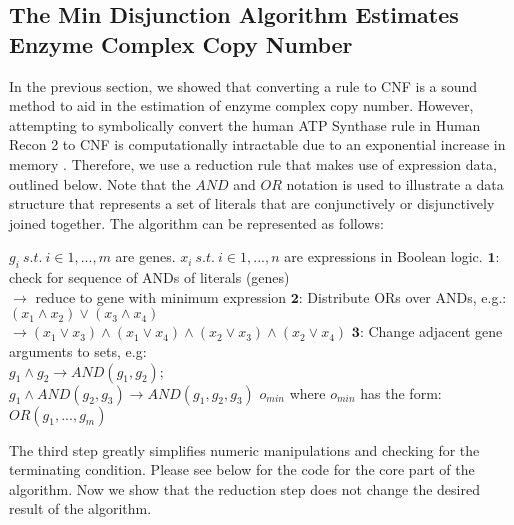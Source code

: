 \begin{methods}
\subsection{The Min Disjunction Algorithm Estimates \\Enzyme Complex Copy Number}

In the previous section, we showed that converting a rule to CNF is a
sound method to aid in the estimation of enzyme complex copy number.
However, attempting to symbolically convert the human ATP Synthase rule in
Human Recon 2 to CNF is computationally intractable due to an
exponential increase in memory \cite{Thiele2013}. Therefore, we use a
reduction rule that makes use of expression data, outlined below.
Note that the $AND$ and $OR$ notation is used to illustrate a
data structure that represents a set of literals that are
conjunctively or disjunctively joined together. The algorithm can be
represented as follows: \\

\pagebreak
\begin{Algorithm}
\label{alg:ReductionToCNF}
\begin{algorithmic}
\REQUIRE $g_i~s.t.~i \in{1, ..., m}$ are genes. 
\REQUIRE $x_i~s.t.~i \in{1, ..., n}$ are expressions in Boolean logic.
  \STATE $\mathbf{1}$: check for sequence of ANDs of literals (genes)\\ 
    \hspace{4.8 mm} $\rightarrow$ reduce to gene with minimum expression 
  \STATE $\mathbf{2}$: Distribute ORs over ANDs, e.g.: $(x_1 \land x_2) \lor (x_3 \land x_4)$ \\ 
    \hspace{4.8 mm} $\rightarrow (x_1 \lor x_3) \land (x_1 \lor x_4) \land (x_2 \lor x_3) \land (x_2 \lor x_4)$
  \STATE $\mathbf{3}$: Change adjacent gene arguments to sets, e.g: \\
    \hspace{4.8 mm} $g_1 \land g_2 \rightarrow AND(g_1,g_2)$;  \\
    \hspace{4.8 mm} $g_1 \land AND(g_2,g_3) \rightarrow AND(g_1,g_2,g_3)$ 
\ENDWHILE
\ENSURE $o_{min}$ where $o_{min}$ has the form: $OR(g_1,...,g_m)$
\end{algorithmic} 
\end{Algorithm}

The third step greatly simplifies numeric manipulations and checking
for the terminating condition. Please see below for the code for the
core part of the algorithm. Now we show that the reduction step does
not change the desired result of the algorithm.


\end{methods}
